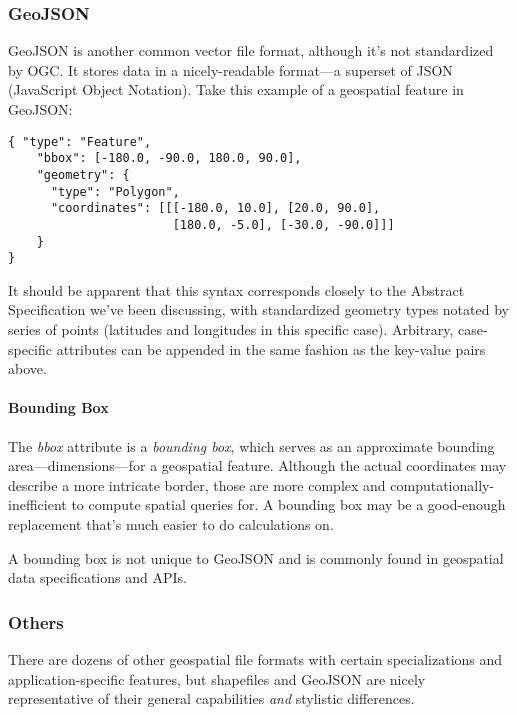 \subsubsection{GeoJSON}
GeoJSON is another common vector file format, although it's not standardized by OGC. It stores data in a nicely-readable format---a superset of JSON (JavaScript Object Notation). Take this example of a geospatial feature in GeoJSON:

\begin{verbatim}
{ "type": "Feature",
    "bbox": [-180.0, -90.0, 180.0, 90.0],
    "geometry": {
      "type": "Polygon",
      "coordinates": [[[-180.0, 10.0], [20.0, 90.0],
                       [180.0, -5.0], [-30.0, -90.0]]]
    }
}
\end{verbatim}

It should be apparent that this syntax corresponds closely to the Abstract Specification we've been discussing, with standardized geometry types notated by series of points (latitudes and longitudes in this specific case). Arbitrary, case-specific attributes can be appended in the same fashion as the key-value pairs above.

\paragraph{Bounding Box}
The \textit{bbox} attribute is a \textit{bounding box}, which serves as an approximate bounding area---dimensions---for a geospatial feature. Although the actual coordinates may describe a more intricate border, those are more complex and computationally-inefficient to compute spatial queries for. A bounding box may be a good-enough replacement that's much easier to do calculations on.

A bounding box is not unique to GeoJSON and is commonly found in geospatial data specifications and APIs.

\subsubsection{Others}
There are dozens of other geospatial file formats with certain specializations and application-specific features, but shapefiles and GeoJSON are nicely representative of their general capabilities \textit{and} stylistic differences.